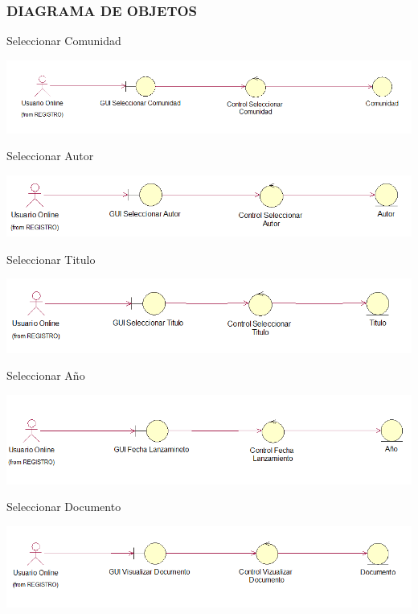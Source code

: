 \subsubsection{DIAGRAMA DE OBJETOS}
\thinspace
\thinspace
\thinspace
Seleccionar Comunidad
\thinspace
\thinspace
\begin{center}
\includegraphics[width=14cm]{./Imagenes/CasoUso4}
\end{center}
\thinspace
\thinspace
\thinspace
\thinspace
\thinspace
\thinspace
\thinspace
\thinspace
\thinspace
\thinspace
\thinspace
\thinspace
\thinspace
\thinspace
Seleccionar Autor
\thinspace
\thinspace
\begin{center}
\includegraphics[width=14cm]{./Imagenes/CasoUso5}
\end{center}
\thinspace
\thinspace
\thinspace
\thinspace
\thinspace
\thinspace
\thinspace
\thinspace
\thinspace
\thinspace
\thinspace
\thinspace
\thinspace
\thinspace
Seleccionar Titulo
\thinspace
\thinspace
\begin{center}
\includegraphics[width=14cm]{./Imagenes/CasoUso6}
\end{center}
\thinspace
\thinspace
\thinspace
\thinspace
\thinspace
\thinspace
\thinspace
\thinspace
\thinspace
\thinspace
\thinspace
\thinspace
\thinspace
\thinspace
Seleccionar Año
\thinspace
\thinspace
\begin{center}
\includegraphics[width=14cm]{./Imagenes/CasoUso7}
\end{center}
\thinspace
\thinspace
\thinspace
\thinspace
\thinspace
\thinspace
\thinspace
\thinspace
\thinspace
\thinspace
\thinspace
\thinspace
\thinspace
\thinspace
Seleccionar Documento
\thinspace
\thinspace
\begin{center}
\includegraphics[width=14cm]{./Imagenes/CasoUso8}
\end{center}